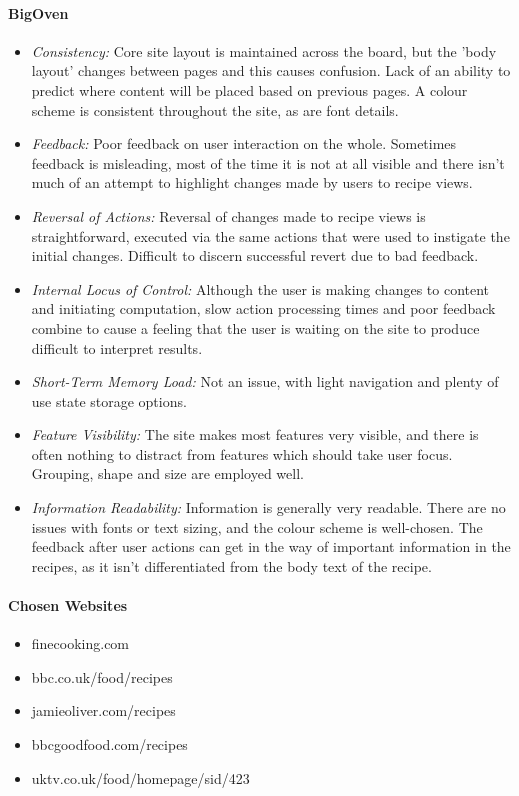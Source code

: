 \paragraph{BigOven}
\begin{itemize}
\item \emph{Consistency:} Core site layout is maintained across the board, but the 'body layout' changes between pages and this causes confusion. Lack of an ability to predict where content will be placed based on previous pages. A colour scheme is consistent throughout the site, as are font details.
\item \emph{Feedback:} Poor feedback on user interaction on the whole. Sometimes feedback is misleading, most of the time it is not at all visible and there isn't much of an attempt to highlight changes made by users to recipe views. 
\item \emph{Reversal of Actions:} Reversal of changes made to recipe views is straightforward, executed via the same actions that were used to instigate the initial changes. Difficult to discern successful revert due to bad feedback.
\item \emph{Internal Locus of Control:} Although the user is making changes to content and initiating computation, slow action processing times and poor feedback combine to cause a feeling that the user is waiting on the site to produce difficult to interpret results.
\item \emph{Short-Term Memory Load:} Not an issue, with light navigation and plenty of use state storage options.
\item \emph{Feature Visibility:} The site makes most features very visible, and there is often nothing to distract from features which should take user focus. Grouping, shape and size are employed well.
\item \emph{Information Readability:} Information is generally very readable. There are no issues with fonts or text sizing, and the colour scheme is well-chosen. The feedback after user actions can get in the way of important information in the recipes, as it isn't differentiated from the body text of the recipe.
\end{itemize}


\paragraph{Chosen Websites}
\begin{itemize}
\item finecooking.com
\item bbc.co.uk/food/recipes
\item jamieoliver.com/recipes
\item bbcgoodfood.com/recipes
\item uktv.co.uk/food/homepage/sid/423
\end{itemize}


